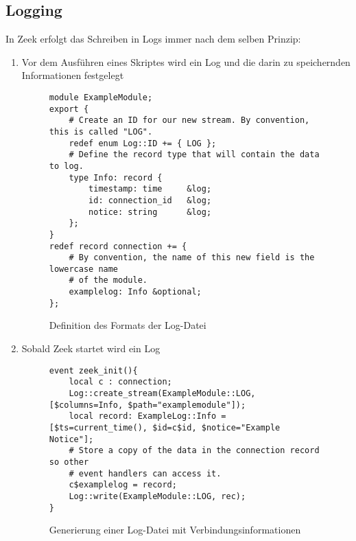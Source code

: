 \subsection{Logging}
In Zeek erfolgt das Schreiben in Logs immer nach dem selben Prinzip:
\begin{enumerate}
\item{Vor dem Ausführen eines Skriptes wird ein Log und die darin zu speichernden Informationen festgelegt}
\begin{figure}[H]
\label{log_1	}
\centering
\begin{lstlisting}
module ExampleModule;
export {
    # Create an ID for our new stream. By convention, this is called "LOG".
    redef enum Log::ID += { LOG };
    # Define the record type that will contain the data to log.
    type Info: record {
        timestamp: time		&log;
        id: connection_id	&log; 
        notice: string		&log;
    };
}
redef record connection += {
    # By convention, the name of this new field is the lowercase name
    # of the module.
    examplelog: Info &optional;
};
\end{lstlisting}
\caption{Definition des Formats der Log-Datei}
\end{figure}
\item{Sobald Zeek startet wird ein Log }
\begin{figure}[H]
\centering
\begin{lstlisting}
event zeek_init(){
	local c : connection;
	Log::create_stream(ExampleModule::LOG, [$columns=Info, $path="examplemodule"]);
	local record: ExampleLog::Info = [$ts=current_time(), $id=c$id, $notice="Example Notice"];
    # Store a copy of the data in the connection record so other
    # event handlers can access it.
    c$examplelog = record;
    Log::write(ExampleModule::LOG, rec);
}
\end{lstlisting}
\caption{Generierung einer Log-Datei mit Verbindungsinformationen}
\end{figure}
\end{enumerate}


